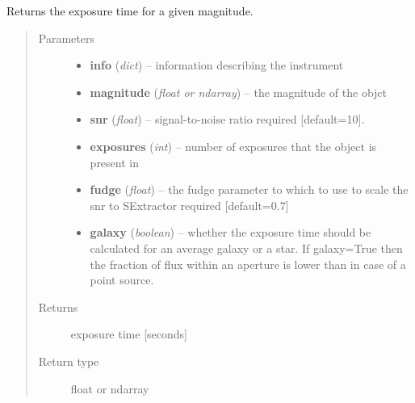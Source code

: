 \documentclass[a4paper,12pt,english]{sphinxmanual}
\begin{document}
\begin{fulllineitems}
\label{ETC:analysis.ETC.exposureTime}
Returns the exposure time for a given magnitude.
\begin{quote}\begin{description}
\item[{Parameters}] \leavevmode\begin{itemize}
\item {} 
\textbf{info} (\emph{dict}) -- information describing the instrument

\item {} 
\textbf{magnitude} (\emph{float or ndarray}) -- the magnitude of the objct

\item {} 
\textbf{snr} (\emph{float}) -- signal-to-noise ratio required {[}default=10{]}.

\item {} 
\textbf{exposures} (\emph{int}) -- number of exposures that the object is present in

\item {} 
\textbf{fudge} (\emph{float}) -- the fudge parameter to which to use to scale the snr to SExtractor required {[}default=0.7{]}

\item {} 
\textbf{galaxy} (\emph{boolean}) -- whether the exposure time should be calculated for an average galaxy or a star.
If galaxy=True then the fraction of flux within an aperture is lower than in case of a point source.

\end{itemize}

\item[{Returns}] \leavevmode
exposure time {[}seconds{]}

\item[{Return type}] \leavevmode
float or ndarray

\end{description}\end{quote}

\end{fulllineitems}

\end{document}
